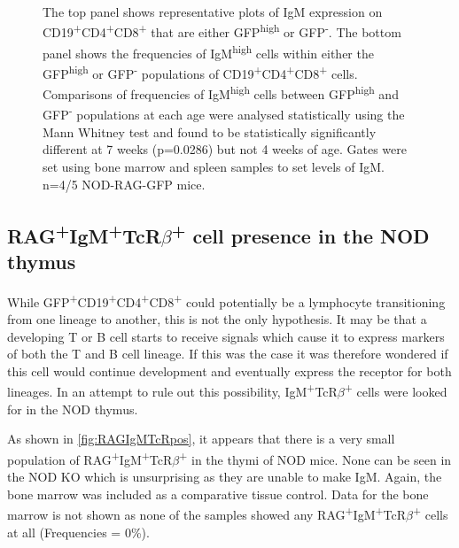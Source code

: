 \begin{figure}
{The top panel shows representative plots of IgM expression on CD19\textsuperscript{+}CD4\textsuperscript{+}CD8\textsuperscript{+} that are either GFP\textsuperscript{high} or GFP\textsuperscript{-}.
The bottom panel shows the frequencies of IgM\textsuperscript{high} cells within either the GFP\textsuperscript{high} or GFP\textsuperscript{-} populations of CD19\textsuperscript{+}CD4\textsuperscript{+}CD8\textsuperscript{+} cells.
Comparisons of frequencies of IgM\textsuperscript{high} cells between GFP\textsuperscript{high} and GFP\textsuperscript{-} populations at each age were analysed statistically using the Mann Whitney test and found to be statistically significantly different at 7 weeks (p=0.0286) but not 4 weeks of age.
Gates were set using bone marrow and spleen samples to set levels of IgM.
n=4/5 NOD-RAG-GFP mice.}
\label{fig:IgMallpos}
\end{figure}


\subsection{RAG\textsuperscript{+}IgM\textsuperscript{+}TcR$\beta$\textsuperscript{+} cell presence in the NOD thymus}

While GFP\textsuperscript{+}CD19\textsuperscript{+}CD4\textsuperscript{+}CD8\textsuperscript{+} could potentially be a lymphocyte transitioning from one lineage to another, this is not the only hypothesis.
It may be that a developing T or B cell starts to receive signals which cause it to express markers of both the T and B cell lineage.
If this was the case it was therefore wondered if this cell would continue development and eventually express the receptor for both lineages.
In an attempt to rule out this possibility, IgM\textsuperscript{+}TcR$\beta$\textsuperscript{+} cells were looked for in the NOD thymus.


As shown in \cref{fig:RAGIgMTcRpos}, it appears that there is a very small population of RAG\textsuperscript{+}IgM\textsuperscript{+}TcR$\beta$\textsuperscript{+} in the thymi of NOD  mice.
None can be seen in the NOD KO which is unsurprising as they are unable to make IgM.
Again, the bone marrow was included as a comparative tissue control.
Data for the bone marrow is not shown as none of the samples showed any RAG\textsuperscript{+}IgM\textsuperscript{+}TcR$\beta$\textsuperscript{+} cells at all (Frequencies = 0\%).

